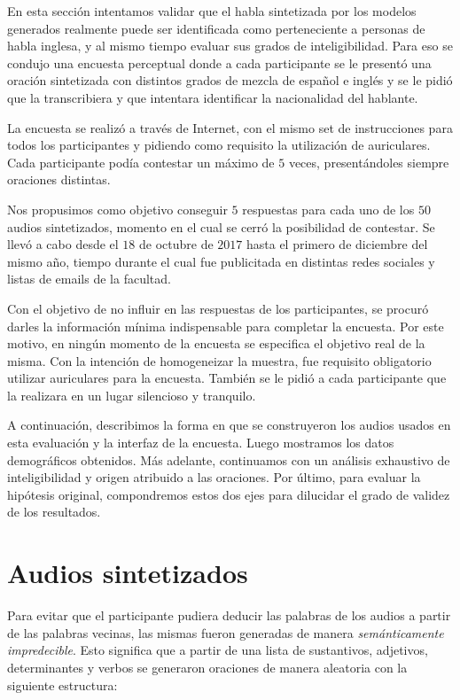 
En esta sección intentamos validar que el habla sintetizada por los modelos generados realmente puede ser identificada como perteneciente a personas de habla inglesa, y al mismo tiempo evaluar sus grados de inteligibilidad. Para eso se condujo una encuesta perceptual donde a cada participante se le presentó una oración sintetizada con distintos grados de mezcla de español e inglés y se le pidió que la transcribiera y que intentara identificar la nacionalidad del hablante. 

La encuesta se realizó a través de Internet, con el mismo set de instrucciones para todos los participantes y pidiendo como requisito la utilización de auriculares. Cada participante podía contestar un máximo de $5$ veces, presentándoles siempre oraciones distintas.

Nos propusimos como objetivo conseguir $5$ respuestas para cada uno de los $50$ audios sintetizados, momento en el cual se cerró la posibilidad de contestar. Se llevó a cabo desde el $18$ de octubre de $2017$ hasta el primero de diciembre del mismo año, tiempo durante el cual fue publicitada en distintas redes sociales y listas de emails de la facultad.

Con el objetivo de no influir en las respuestas de los participantes, se procuró darles la información mínima indispensable para completar la encuesta. Por este motivo, en ningún momento de la encuesta se especifica el objetivo real de la misma. Con la intención de homogeneizar la muestra, fue requisito obligatorio utilizar auriculares para la encuesta. También se le pidió a cada participante que la realizara en un lugar silencioso y tranquilo.

A continuación, describimos la forma en que se construyeron los audios usados en esta evaluación y la interfaz de la encuesta. Luego mostramos los datos demográficos  obtenidos. Más adelante, continuamos con un análisis exhaustivo de inteligibilidad y origen atribuido a las oraciones.
Por último, para evaluar la hipótesis original, compondremos estos dos ejes para dilucidar el grado de validez de los resultados.

\section{Audios sintetizados}

Para evitar que el participante pudiera deducir las palabras de los audios a partir de las palabras vecinas, las mismas fueron generadas de manera \textit{semánticamente impredecible}. Esto significa que a partir de una lista de sustantivos, adjetivos, determinantes y verbos se generaron oraciones de manera aleatoria con la siguiente estructura:

